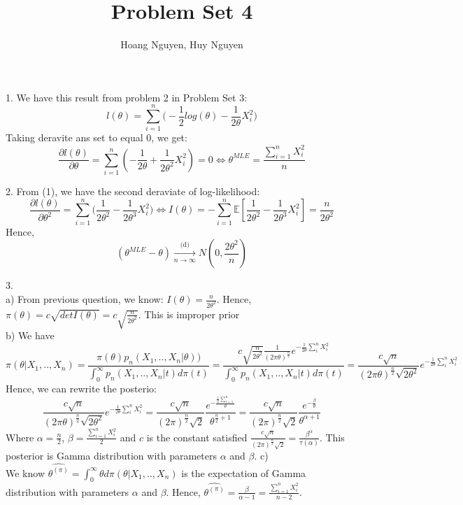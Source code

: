 \documentclass[10pt]{article}
\newenvironment{problem}[2][Problem]{\begin{trivlist}
\item[\hskip \labelsep {\bfseries #1}\hskip \labelsep {\bfseries #2.}]}{\end{trivlist}}
\begin{document}
\title{Problem Set 4}
\author{Hoang Nguyen, Huy Nguyen}
\maketitle
    
\begin{problem}{1}
\item 1.
We have this result from problem 2 in Problem Set 3: 
\[ l(\theta) = \sum_{i=1}^{n} \Big ( -\frac{1}{2} log(\theta) -\frac{1}{2\theta} X_i^2\Big ) \]
Taking deravite ans set to equal 0, we get:
\[\frac{\partial l(\theta)}{\partial\theta} = \sum_{i=1}^{n}(-\frac{1}{2\theta} + \frac{1}{2\theta^2} X_i^2)=0 \Longleftrightarrow \theta^{MLE} = \frac{\sum_{i=1}^{n} X_i^2}{n} \tag{1}\]




\item 2. 
From (1), we have the second deraviate of log-likelihood:
\[\frac{\partial l(\theta)}{\partial \theta^2} =\sum_{i=1}^{n} \Big ( \frac{1}{2\theta^2} - \frac{1}{2\theta^3}X_i^2 \Big ) \Leftrightarrow I(\theta) = -\sum_{i=1}^{n}\mathbb{E}[\frac{1}{2\theta^2} - \frac{1}{2\theta^3}X_i^2]= \frac{n}{2\theta^2}\]
Hence,
\[(\theta^{MLE} - \theta)  \xrightarrow[n \rightarrow \infty]{\text{(d)}} N(0, \frac{2\theta^2}{n})  \]




\item 3.\\ 
a) From previous question, we know: $I(\theta) = \frac{n}{2\theta^2}$. Hence, $\pi(\theta) = c\sqrt{det I(\theta)} = c\sqrt{\frac{n}{2\theta^2}}$. This is improper prior\\
b) We have 
\[ \pi(\theta| X_1,..,X_n) = \frac{\pi(\theta) p_n(X_1,..,X_n|\theta))}{\int_{0}^{\infty} p_n(X_1,..,X_n|t)d\pi(t)} = \frac{c\sqrt{\frac{n}{2\theta^2}} \frac{1}{(2\pi\theta)^{\frac{n}{2}}} e^{-\frac{1}{2\theta} \sum_{i}^{n} X_i^2}}{\int_{0}^{\infty} p_n(X_1,..,X_n|t)d\pi(t)} = \frac{c\sqrt{n}}{(2\pi\theta)^{\frac{n}{2}} \sqrt{2\theta^2}} e^{-\frac{1}{2\theta} \sum_{i}^{n} X_i^2}\]
Hence, we can rewrite the posterio:
\[\frac{c\sqrt{n}}{(2\pi\theta)^{\frac{n}{2}} \sqrt{2\theta^2}} e^{-\frac{1}{2\theta} \sum_{i}^{n} X_i^2} = \frac{c\sqrt{n}}{(2\pi)^{\frac{n}{2}} \sqrt{2}} \frac{e^{-\frac{\frac{1}{2} \sum_{i=1}^{n}}{\theta}}}{\theta^{\frac{n}{2} +1}} = \frac{c\sqrt{n}}{(2\pi)^{\frac{n}{2}} \sqrt{2}} \frac{e^{-\frac{\beta}{\theta}}}{\theta^{\alpha+1}} \]
Where $\alpha = \frac{n}{2}$, $\beta = \frac{\sum_{i=1}^{n} X_i^2}{2}$ and $c$ is the constant satisfied $\frac{c\sqrt{n}}{(2\pi)^{\frac{n}{2}} \sqrt{2}} = \frac{\beta^{\alpha}}{\tau(\alpha)}$. This posterior is Gamma distribution with parameters $\alpha$ and $\beta$.
c)\\
We know $\hat{\theta^{(\pi)}}= \int_{0}^{\infty} \theta d \pi(\theta| X_1,..,X_n)$ is the expectation of Gamma distribution with parameters $\alpha$ and $\beta$. Hence, $\hat{\theta^{(\pi)}} = \frac{\beta}{\alpha - 1} = \frac{\sum_{i=1}^{n} X_i^2}{n -2}$.


\end{problem}

\begin{problem}{2}


\end{problem}
\begin{problem}{3}


\end{problem}
\end{document}
